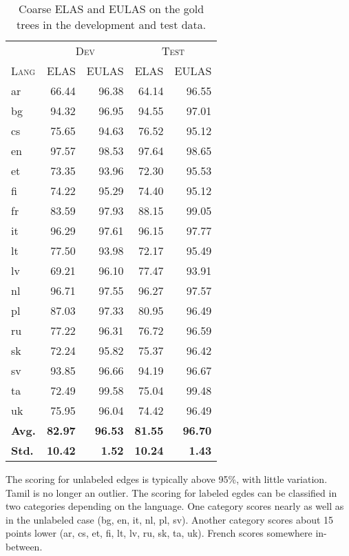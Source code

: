 \documentclass[11pt,a4paper]{article}
\begin{document}
\begin{table}[ht]
	\centering
    \small
	\begin{tabular}{l|rrrr}
        & \multicolumn{2}{c}{\textsc{Dev}} & \multicolumn{2}{c}{\textsc{Test}} \\
		\textsc{Lang} & \textsc{ELAS} & \textsc{EULAS} & \textsc{ELAS} & \textsc{EULAS} \\
		\hline 
		ar & 66.44 & 96.38 & 64.14 & 96.55 \\
		bg & 94.32 & 96.95 & 94.55 & 97.01 \\
		cs & 75.65 & 94.63 & 76.52 & 95.12 \\
		en & 97.57 & 98.53 & 97.64 & 98.65 \\
		et & 73.35 & 93.96 & 72.30 & 95.53 \\
		fi & 74.22 & 95.29 & 74.40 & 95.12 \\
		fr & 83.59 & 97.93 & 88.15 & 99.05 \\
		it & 96.29 & 97.61 & 96.15 & 97.77 \\
		lt & 77.50 & 93.98 & 72.17 & 95.49 \\
		lv & 69.21 & 96.10 & 77.47 & 93.91 \\
		nl & 96.71 & 97.55 & 96.27 & 97.57 \\
		pl & 87.03 & 97.33 & 80.95 & 96.49 \\
		ru & 77.22 & 96.31 & 76.72 & 96.59 \\
		sk & 72.24 & 95.82 & 75.37 & 96.42 \\
		sv & 93.85 & 96.66 & 94.19 & 96.67 \\
		ta & 72.49 & 99.58 & 75.04 & 99.48 \\
		uk & 75.95 & 96.04 & 74.42 & 96.49 \\
		\textbf{Avg.} & \textbf{82.97}  & \textbf{96.53}& \textbf{81.55} & \textbf{96.70} \\
        \textbf{Std.} & \textbf{10.42} & \textbf{1.52} & \textbf{10.24} & \textbf{1.43} \\
	\end{tabular}
	\caption{\label{tab:gold-data}Coarse ELAS and EULAS on the gold trees in the development and test data.}
\end{table} 

The scoring for unlabeled edges is typically above 95\%, with little
variation. Tamil is no longer an outlier. The scoring for labeled
egdes can be classified in two categories depending on the
language. One category scores nearly as well as in the unlabeled case
(bg, en, it, nl, pl, sv). Another category scores about 15 points
lower (ar, cs, et, fi, lt, lv, ru, sk, ta, uk). French scores
somewhere in-between.
\end{document}
